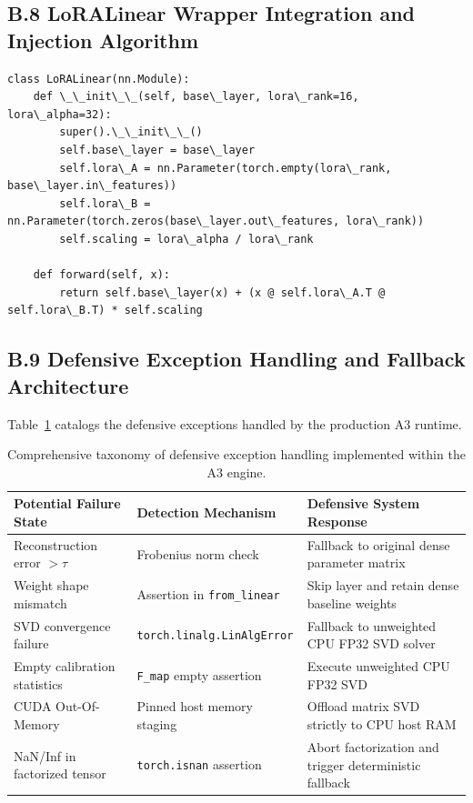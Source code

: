 \subsection{B.8 LoRALinear Wrapper Integration and Injection Algorithm}
\label{sec:app_lora_wrapper}

\begin{lstlisting}
class LoRALinear(nn.Module):
    def \_\_init\_\_(self, base\_layer, lora\_rank=16, lora\_alpha=32):
        super().\_\_init\_\_()
        self.base\_layer = base\_layer
        self.lora\_A = nn.Parameter(torch.empty(lora\_rank, base\_layer.in\_features))
        self.lora\_B = nn.Parameter(torch.zeros(base\_layer.out\_features, lora\_rank))
        self.scaling = lora\_alpha / lora\_rank
        
    def forward(self, x):
        return self.base\_layer(x) + (x @ self.lora\_A.T @ self.lora\_B.T) * self.scaling
\end{lstlisting}

\subsection{B.9 Defensive Exception Handling and Fallback Architecture}
\label{sec:app_defensive_handling}

Table~\ref{tab:app_failure_responses} catalogs the defensive exceptions handled by the production A3 runtime.

\begin{table}[H]
\centering
\small
\begin{tabular}{lll}
\toprule
\textbf{Potential Failure State} & \textbf{Detection Mechanism} & \textbf{Defensive System Response} \\
\midrule
Reconstruction error $> \tau$ & Frobenius norm check & Fallback to original dense parameter matrix \\
Weight shape mismatch & Assertion in \texttt{from\_linear} & Skip layer and retain dense baseline weights \\
SVD convergence failure & \texttt{torch.linalg.LinAlgError} & Fallback to unweighted CPU FP32 SVD solver \\
Empty calibration statistics & \texttt{F\_map} empty assertion & Execute unweighted CPU FP32 SVD \\
CUDA Out-Of-Memory & Pinned host memory staging & Offload matrix SVD strictly to CPU host RAM \\
NaN/Inf in factorized tensor & \texttt{torch.isnan} assertion & Abort factorization and trigger deterministic fallback \\
\bottomrule
\end{tabular}
\caption{Comprehensive taxonomy of defensive exception handling implemented within the A3 engine.}
\label{tab:app_failure_responses}
\end{table}

